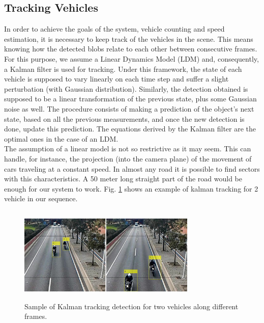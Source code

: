 \subsection{Tracking Vehicles}
\label{sec:tracking}

In order to achieve the goals of the system, vehicle counting and speed estimation, it is necessary to keep track of the vehicles in the scene. This means knowing how the detected blobs relate to each other between consecutive frames.\\

\noindent For this purpose, we assume a Linear Dynamics Model (LDM) and, consequently, a Kalman filter \cite{kalman} is used for tracking. Under this framework, the state of each vehicle is supposed to vary linearly on each time step and suffer a slight perturbation (with Gaussian distribution). Similarly, the detection obtained is supposed to be a linear transformation of the previous state, plus some Gaussian noise as well. The procedure consists of making a prediction of the object's next state, based on all the previous measurements, and once the new detection is done, update this prediction. The equations derived by the Kalman filter are the optimal ones in the case of an LDM.\\

\noindent The assumption of a linear model is not so restrictive as it may seem. This can handle, for instance, the projection (into the camera plane) of the movement of cars traveling at a constant speed. In almost any road it is possible to find sectors with this characteristics. A 50 meter long straight part of the road would be enough for our system to work. Fig. \ref{fig:kalman} shows an example of kalman tracking for 2 vehicle in our sequence.

\begin{figure}[h]
\centering
\includegraphics[width=240pt, height=130pt]{figures/example_kalman.png}
\caption{Sample of Kalman tracking detection for two vehicles along different frames.}
\label{fig:kalman}
\end{figure}